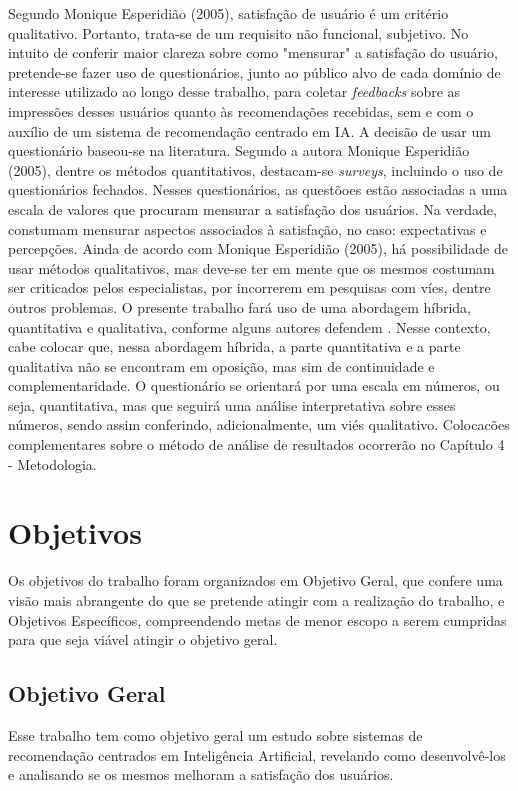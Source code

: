 Segundo Monique Esperidião (2005), satisfação de usuário é um critério qualitativo. Portanto, trata-se de um requisito não
funcional, subjetivo. No intuito de conferir maior clareza sobre como "mensurar" a satisfação do usuário, pretende-se 
fazer uso de questionários, junto ao público alvo de cada domínio de interesse utilizado ao longo desse trabalho, 
para coletar \textit{feedbacks} sobre as impressões desses usuários quanto às recomendações recebidas, sem e com o auxílio de um 
sistema de recomendação centrado em IA. A decisão de usar um questionário baseou-se na literatura. Segundo a autora 
Monique Esperidião (2005), dentre os métodos quantitativos, destacam-se \textit{surveys}, incluindo o uso de questionários 
fechados. Nesses questionários, as questõoes estão associadas a uma escala de valores que procuram mensurar a satisfação 
dos usuários. Na verdade, constumam mensurar aspectos associados à satisfação, no caso: expectativas e percepções. 
Ainda de acordo com Monique Esperidião (2005), há possibilidade de usar métodos qualitativos, mas deve-se ter em mente 
que os mesmos costumam ser criticados pelos especialistas, por incorrerem em pesquisas com víes, dentre outros problemas. 
O presente trabalho fará uso de uma abordagem híbrida, quantitativa e qualitativa, conforme alguns autores defendem 
\cite{minayo1993}. Nesse contexto, cabe colocar que, nessa abordagem híbrida, a parte quantitativa e a parte qualitativa 
não se encontram em oposição, mas sim de continuidade e complementaridade. O questionário se orientará por uma escala em 
números, ou seja, quantitativa, mas que seguirá uma análise interpretativa sobre esses números, sendo assim conferindo, 
adicionalmente, um viés qualitativo. Colocacões complementares sobre o método de análise de resultados ocorrerão no 
Capítulo 4 - Metodologia.

\section{Objetivos}\label{sec:objetivos}
Os objetivos do trabalho foram organizados em Objetivo Geral, que confere uma visão mais abrangente do que se pretende 
atingir com a realização do trabalho, e Objetivos Específicos, compreendendo metas de menor escopo a serem cumpridas 
para que seja viável atingir o objetivo geral.

\subsection{Objetivo Geral}
Esse trabalho tem como objetivo geral um estudo sobre sistemas de recomendação centrados em Inteligência Artificial, 
revelando como desenvolvê-los e analisando se os mesmos melhoram a satisfação dos usuários.

